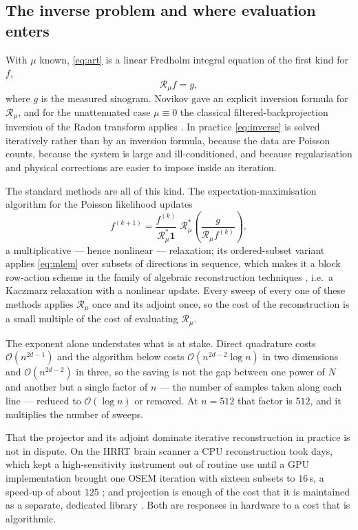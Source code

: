 \documentclass[11pt]{article}
\newcommand{\Rmu}{\mathcal{R}_{\mu}}
\newcommand{\bigO}{\mathcal{O}}
\begin{document}
\subsection{The inverse problem and where evaluation enters}
\label{sec:motivation}

With $\mu$ known, \eqref{eq:art} is a linear Fredholm integral equation of the
first kind for $f$,
\begin{equation}
  \Rmu f = g ,
  \label{eq:inverse}
\end{equation}
where $g$ is the measured sinogram. Novikov \citep{novikov2002} gave an
explicit inversion formula for $\Rmu$, and for the unattenuated case
$\mu\equiv 0$ the classical filtered-backprojection inversion of the Radon
transform applies \citep{natterer2001}. In practice \eqref{eq:inverse} is
solved iteratively rather than by an inversion formula, because the data are
Poisson counts, because the system is large and ill-conditioned, and because
regularisation and physical corrections are easier to impose inside an
iteration.

The standard methods are all of this kind. The expectation-maximisation
algorithm for the Poisson likelihood \citep{sheppvardi1982} updates
\begin{equation}
  f^{(k+1)} = \frac{f^{(k)}}{\Rmu^{*}\mathbf{1}}\;
              \Rmu^{*}\!\left(\frac{g}{\Rmu f^{(k)}}\right),
  \label{eq:mlem}
\end{equation}
a multiplicative --- hence nonlinear --- relaxation; its ordered-subset
variant \citep{hudsonlarkin1994} applies \eqref{eq:mlem} over subsets of
directions in sequence, which makes it a block row-action scheme in the family
of algebraic reconstruction techniques \citep{gordon1970}, i.e.\ a Kaczmarz
relaxation with a nonlinear update. Every sweep of every one of these methods
applies $\Rmu$ once and its adjoint once, so the cost of the reconstruction is
a small multiple of the cost of evaluating $\Rmu$.

The exponent alone understates what is at stake. Direct quadrature costs
$\bigO(n^{2d-1})$ and the algorithm below costs $\bigO(n^{2d-2}\log n)$ in two
dimensions and $\bigO(n^{2d-2})$ in three, so the saving is not the gap between
one power of $N$ and another but a single factor of $n$ --- the number of
samples taken along each line --- reduced to $\bigO(\log n)$ or removed. At
$n = 512$ that factor is $512$, and it multiplies the number of sweeps.

That the projector and its adjoint dominate iterative reconstruction in
practice is not in dispute. On the HRRT brain scanner a CPU reconstruction took
days, which kept a high-sensitivity instrument out of routine use until a GPU
implementation brought one OSEM iteration with sixteen subsets to $16$\,s, a
speed-up of about $125$ \citep{kimye2011}; and projection is enough of the cost
that it is maintained as a separate, dedicated library
\citep{parallelproj2024}. Both are responses in hardware to a cost that is
algorithmic.
\end{document}
